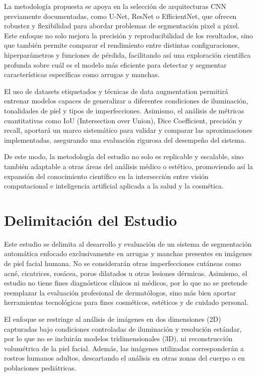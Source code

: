 La metodología propuesta se apoya en la selección de arquitecturas CNN previamente documentadas, como U-Net, ResNet o EfficientNet, que ofrecen robustez y flexibilidad para abordar problemas de segmentación pixel a pixel. Este enfoque no solo mejora la precisión y reproducibilidad de los resultados, sino que también permite comparar el rendimiento entre distintas configuraciones, hiperparámetros y funciones de pérdida, facilitando así una exploración científica profunda sobre cuál es el modelo más eficiente para detectar y segmentar características específicas como arrugas y manchas.

El uso de datasets etiquetados y técnicas de data augmentation permitirá entrenar modelos capaces de generalizar a diferentes condiciones de iluminación, tonalidades de piel y tipos de imperfecciones. Asimismo, el análisis de métricas cuantitativas como IoU (Intersection over Union), Dice Coefficient, precisión y recall, aportará un marco sistemático para validar y comparar las aproximaciones implementadas, asegurando una evaluación rigurosa del desempeño del sistema.

De este modo, la metodología del estudio no solo es replicable y escalable, sino también adaptable a otras áreas del análisis médico o estético, promoviendo así la expansión del conocimiento científico en la intersección entre visión computacional e inteligencia artificial aplicada a la salud y la cosmética.

\section{Delimitación del Estudio}
Este estudio se delimita al desarrollo y evaluación de un sistema de segmentación automática enfocado exclusivamente en arrugas y manchas presentes en imágenes de piel facial humana. No se considerarán otras imperfecciones cutáneas como acné, cicatrices, rosácea, poros dilatados u otras lesiones dérmicas. Asimismo, el estudio no tiene fines diagnósticos clínicos ni médicos, por lo que no se pretende reemplazar la evaluación profesional de dermatólogos, sino más bien aportar herramientas tecnológicas para fines cosméticos, estéticos y de cuidado personal.

El enfoque se restringe al análisis de imágenes en dos dimensiones (2D) capturadas bajo condiciones controladas de iluminación y resolución estándar, por lo que no se incluirán modelos tridimensionales (3D), ni reconstrucción volumétrica de la piel facial. Además, las imágenes utilizadas corresponderán a rostros humanos adultos, descartando el análisis en otras zonas del cuerpo o en poblaciones pediátricas.

